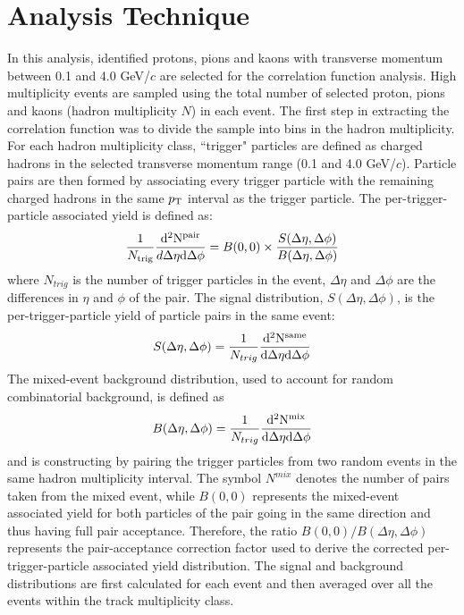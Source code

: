 \documentclass[aps,prl,twocolumn,showpacs,superscriptaddress,groupedaddress]{revtex4}  %
\begin{document}
\section{\label{sec:analysis}Analysis Technique}
In this analysis, identified protons, pions and kaons with transverse momentum between 0.1 and 4.0 GeV/$c$ 
are selected for the correlation function analysis. High multiplicity events are sampled using the total number of selected proton, 
pions and kaons (hadron multiplicity $N$) in each event. The first step in extracting the correlation function was to divide the sample 
into bins in the hadron multiplicity. For each hadron multiplicity class, ``trigger" particles are defined as charged hadrons in the selected transverse momentum range (0.1 and 4.0 GeV/$c$). Particle pairs are then formed by associating every trigger particle with the remaining charged hadrons in the same $p_{\rm T}$ interval as the trigger particle. The per-trigger-particle associated yield is defined as:
\begin{eqnarray}
\label{eq:associatedyield}
\frac{1}{N_{\rm trig}}\frac{\rm d^2N^{pair}}{d\Delta\eta  \rm d\Delta\phi}= B(0,0) \times \frac{S(\Delta\eta, \Delta\phi)}{B(\Delta\eta, \Delta\phi)}
\end{eqnarray}
where $N_{trig}$ is the number of trigger particles in the event, $\Delta\eta$ and $\Delta\phi$ are the differences in $\eta$ and $\phi$ of the pair. The signal distribution, $S(\Delta\eta, \Delta\phi)$, 
is the per-trigger-particle yield of particle pairs in the same event: 
\begin{eqnarray}
\label{eq:S}
S(\Delta\eta,\Delta\phi) = \frac{1}{N_{trig}}\frac{\rm d^2 N^{\rm same}}{\rm d\Delta\eta \rm d\Delta\phi}
\end{eqnarray}
The mixed-event background distribution, used to account for random combinatorial background, is defined as 
\begin{eqnarray}
\label{eq:B}
B(\Delta\eta,\Delta\phi) = \frac{1}{N_{trig}}\frac{\rm d^2 N^{\rm mix}}{\rm d\Delta\eta \rm d\Delta\phi}
\end{eqnarray}
and is constructing by pairing the trigger particles from two random events in the same hadron multiplicity interval.
The symbol $N^{mix}$ denotes the number of pairs taken from the mixed event, while $B(0,0)$ represents the mixed-event associated yield for both particles of the pair going in the same direction and thus having full pair acceptance. Therefore, 
the ratio $B(0,0)/B(\Delta\eta,\Delta\phi)$ represents the pair-acceptance correction factor used to derive the corrected per-trigger-particle
associated yield distribution.  The signal and background distributions are first calculated for each event and then averaged over all the events within the track multiplicity class. 
\end{document}
